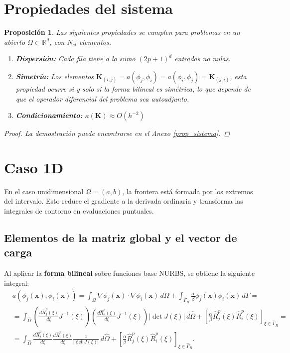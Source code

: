 \documentclass[11pt]{book}
\theoremstyle{plain} %
\newtheorem{proposicion}[teorema]{Proposición}
\theoremstyle{definition} %
\theoremstyle{definition} %
\newcommand\R{\mathbb{R}}
\begin{document}
\section{Propiedades del sistema}
\begin{proposicion}
    

Las siguientes propiedades se cumplen para problemas en un abierto $\Omega \subset \R^d$, con $N_{el}$ elementos.

\vspace{-0.2cm}
\begin{enumerate}
    \item \textbf{Dispersión:} Cada fila tiene a lo sumo $(2p+1)^d$ entradas no nulas.
    \item \textbf{Simetría:} Los elementos $\mathbf{K}_{(i,j)}=a(\phi_j,\phi_i)=a(\phi_i,\phi_j)=\mathbf{K}_{(j,i)}$, esta propiedad ocurre si y solo si la forma bilineal es simétrica, lo que depende de que el operador diferencial del problema sea autoadjunto.
    \item \textbf{Condicionamiento:} $\kappa(\mathbf{K}) \approx O(h^{-2})$
\end{enumerate}
\begin{proof}
    La demostración puede encontrarse en el Anexo \ref{prop_sistema}.
\end{proof}
\end{proposicion}

\section{Caso 1D}\label{sec:1D}

En el caso unidimensional $\Omega = (a, b)$, la frontera está formada por los extremos del
intervalo. Esto reduce el gradiente a la derivada ordinaria y transforma las integrales de contorno en evaluaciones puntuales.

\subsection{Elementos de la matriz global y el vector de carga}
Al aplicar la \textbf{forma bilineal} sobre funciones base NURBS, se obtiene la siguiente integral:
\begin{align*}
    &a(\phi_j(\mathbf{x}),\phi_i(\mathbf{x})) = \int_{\Omega}\nabla \phi_j(\mathbf{x}) \cdot \nabla \phi_i(\mathbf{x}) \, d\Omega + \int_{\Gamma_R}\frac{\alpha}{\beta}\phi_j(\mathbf{x})\phi_i(\mathbf{x}) \, d\Gamma =\\[10pt]
    &= \int_{\hat{\Omega}} \left( \frac{d\hat{R}_{j}^p(\xi)}{d\xi} J^{-1}(\xi) \right) \left( \frac{d\hat{R}_{i}^p(\xi)}{d\xi} J^{-1}(\xi) \right) |\det J(\xi)| \, d\hat{\Omega} + \left[ \frac{\alpha}{\beta}\hat{R}_{j}^p(\xi)\hat{R}_{i}^p(\xi) \right]_{\xi \in \hat{\Gamma}_R}= \\[10pt]
    &= \int_{\hat{\Omega}} \frac{d\hat{R}_{j}^p(\xi)}{d\xi} \frac{d\hat{R}_{i}^p(\xi)}{d\xi} \frac{1}{|\det J(\xi)|} \, d\hat{\Omega} + \left[ \frac{\alpha}{\beta}\hat{R}_{j}^p(\xi)\hat{R}_{i}^p(\xi) \right]_{\xi \in \hat{\Gamma}_R}.
\end{align*}
\end{document}
